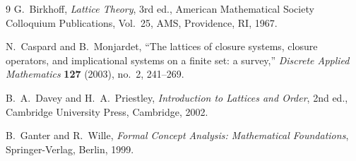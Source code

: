 \documentclass[11pt,a4paper]{article}
\theoremstyle{definition}
\theoremstyle{remark}
\begin{document}
\begin{thebibliography}{9}
G.~Birkhoff, \emph{Lattice Theory}, 3rd ed., American Mathematical Society Colloquium Publications, Vol.~25, AMS, Providence, RI, 1967.

N.~Caspard and B.~Monjardet, ``The lattices of closure systems, closure operators, and implicational systems on a finite set: a survey,'' \emph{Discrete Applied Mathematics} \textbf{127} (2003), no.~2, 241--269.

B.~A.~Davey and H.~A.~Priestley, \emph{Introduction to Lattices and Order}, 2nd ed., Cambridge University Press, Cambridge, 2002.

B.~Ganter and R.~Wille, \emph{Formal Concept Analysis: Mathematical Foundations}, Springer-Verlag, Berlin, 1999.
\end{thebibliography}
\end{document}
